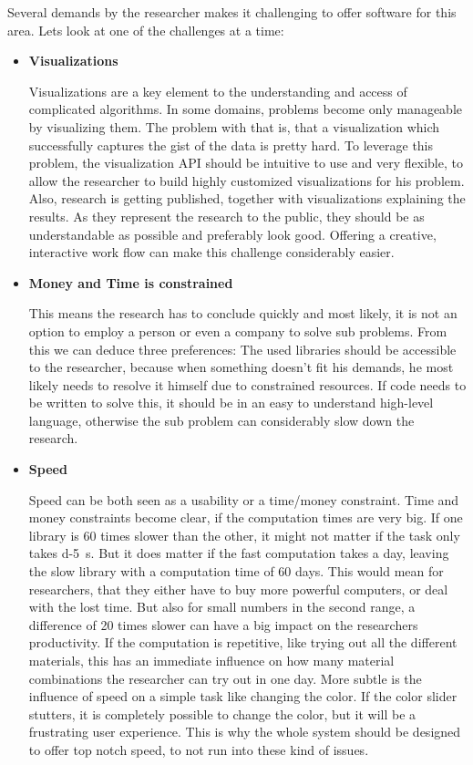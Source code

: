 Several demands by the researcher makes it challenging to offer software for this area.
Lets look at one of the challenges at a time:

\begin{itemize} 

    \item  \textbf{Visualizations}

    Visualizations are a key element to the understanding and access of complicated algorithms.
    In some domains, problems become only manageable by visualizing them.
    The problem with that is, that a visualization which successfully captures the gist of the data is pretty hard.
    To leverage this problem, the visualization API should be intuitive to use and very flexible, to allow the researcher to build highly customized visualizations for his problem.
    Also, research is getting published, together with visualizations explaining the results. As they represent the research to the public, they should be as understandable as possible and preferably look good.
    Offering a creative, interactive work flow can make this challenge considerably easier.

    \item \textbf{Money and Time is constrained}
    
    This means the research has to conclude quickly and most likely, it is not an option to employ a person or even a company to solve sub problems.
    From this we can deduce three preferences: 
    The used libraries should be accessible to the researcher, because when something doesn't fit his demands, he most likely needs to resolve it himself due to constrained resources.
    If code needs to be written to solve this, it should be in an easy to understand high-level language, otherwise the sub problem can considerably slow down the research.

    \item \textbf{Speed}
    
    Speed can be both seen as a usability or a time/money constraint. 
    Time and money constraints become clear, if the computation times are very big. If one library is 60 times slower than the other, it might not matter if the task only takes \SI{d-5}{\second}. But it does matter if the fast computation takes a day, leaving the slow library with a computation time of 60 days.
    This would mean for researchers, that they either have to buy more powerful computers, or deal with the lost time.
    But also for small numbers in the second range, a difference of 20 times slower can have a big impact on the researchers productivity. If the computation is repetitive, like trying out all the different materials, this has an immediate influence on how many material combinations the researcher can try out in one day.
    More subtle is the influence of speed on a simple task like changing the color. If the color slider stutters, it is completely possible to change the color, but it will be a frustrating user experience. 
    This is why the whole system should be designed to offer top notch speed, to not run into these kind of issues.

\end{itemize} 


